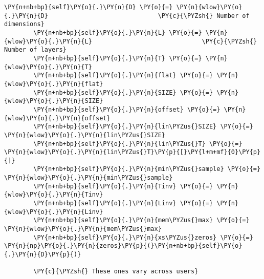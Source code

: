\begin{Verbatim}[commandchars=\\\{\}]
        \PY{n+nb+bp}{self}\PY{o}{.}\PY{n}{D} \PY{o}{=} \PY{n}{wlow}\PY{o}{.}\PY{n}{D}                              \PY{c}{\PYZsh{} Number of dimensions}
        \PY{n+nb+bp}{self}\PY{o}{.}\PY{n}{L} \PY{o}{=} \PY{n}{wlow}\PY{o}{.}\PY{n}{L}                              \PY{c}{\PYZsh{} Number of layers}
        \PY{n+nb+bp}{self}\PY{o}{.}\PY{n}{T} \PY{o}{=} \PY{n}{wlow}\PY{o}{.}\PY{n}{T}
        \PY{n+nb+bp}{self}\PY{o}{.}\PY{n}{flat} \PY{o}{=} \PY{n}{wlow}\PY{o}{.}\PY{n}{flat}
        \PY{n+nb+bp}{self}\PY{o}{.}\PY{n}{SIZE} \PY{o}{=} \PY{n}{wlow}\PY{o}{.}\PY{n}{SIZE}
        \PY{n+nb+bp}{self}\PY{o}{.}\PY{n}{offset} \PY{o}{=} \PY{n}{wlow}\PY{o}{.}\PY{n}{offset}
        \PY{n+nb+bp}{self}\PY{o}{.}\PY{n}{lin\PYZus{}SIZE} \PY{o}{=} \PY{n}{wlow}\PY{o}{.}\PY{n}{lin\PYZus{}SIZE}
        \PY{n+nb+bp}{self}\PY{o}{.}\PY{n}{lin\PYZus{}T} \PY{o}{=} \PY{n}{wlow}\PY{o}{.}\PY{n}{lin\PYZus{}T}\PY{p}{[}\PY{l+m+mf}{0}\PY{p}{]}
        \PY{n+nb+bp}{self}\PY{o}{.}\PY{n}{min\PYZus{}sample} \PY{o}{=} \PY{n}{wlow}\PY{o}{.}\PY{n}{min\PYZus{}sample}
        \PY{n+nb+bp}{self}\PY{o}{.}\PY{n}{Tinv} \PY{o}{=} \PY{n}{wlow}\PY{o}{.}\PY{n}{Tinv}
        \PY{n+nb+bp}{self}\PY{o}{.}\PY{n}{Linv} \PY{o}{=} \PY{n}{wlow}\PY{o}{.}\PY{n}{Linv}
        \PY{n+nb+bp}{self}\PY{o}{.}\PY{n}{mem\PYZus{}max} \PY{o}{=} \PY{n}{wlow}\PY{o}{.}\PY{n}{mem\PYZus{}max}
        \PY{n+nb+bp}{self}\PY{o}{.}\PY{n}{xs\PYZus{}zeros} \PY{o}{=} \PY{n}{np}\PY{o}{.}\PY{n}{zeros}\PY{p}{(}\PY{n+nb+bp}{self}\PY{o}{.}\PY{n}{D}\PY{p}{)}

        \PY{c}{\PYZsh{} These ones vary across users}


\end{Verbatim}
